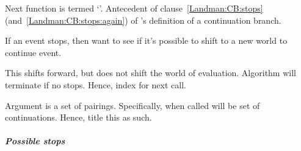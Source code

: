 \begin{note}
  Next function is termed `\AlgGetStops{}'.
  Antecedent of clause~\ref{Landman:CB:stops} (and~\ref{Landman:CB:stops:again}) of \citeauthor{Landman:1992wh}'s definition of a continuation branch.

  If an event stops, then want to see if it's possible to shift to a new world to continue event.

  This shifts forward, but does not shift the world of evaluation.
  Algorithm will terminate if no stops.
  Hence, index for next call.

  Argument is a set of pairings.
  Specifically, when called will be set of continuations.
  Hence, title this as such.

  \begin{algorithm}[H]
    \SetAlgoLined
    \DontPrintSemicolon
    \caption{\AlgGetStops{}\label{PrAl:g-s}}
  \end{algorithm}
\end{note}

\subparagraph{Possible stops}

